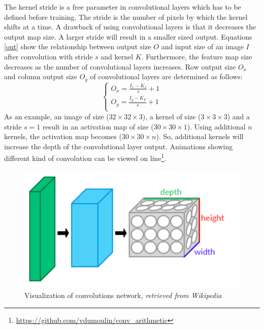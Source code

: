     The kernel stride is a free parameter in convolutional layers which has to be defined before training. The stride is the number of pixels by which the kernel shifts at a time. A drawback of using convolutional layers is that it decreases the output map size. A larger stride will result in a smaller sized output. Equations \ref{out} show the relationship between output size $O$ and input size of an image $I$ after convolution with stride $s$ and kernel $K$. Furthermore, the feature map size decreases as the number of convolutional layers increases. Row output size $O_x$ and column output size $O_y$ of convolutional layers are determined as follows:
    \begin{equation}
        \begin{cases}
            O_x = \frac{I_x-K_x}{s} + 1 \\
            O_y = \frac{I_y - K_Y}{s} + 1 \\
        \end{cases}
        \label{out}
    \end{equation}
    As an example, an image of size ($32\times 32 \times 3$), a kernel of size ($3\times 3\times 3$) and a stride $s=1$ result in an activation map of size ($30 \times 30 \times 1$). Using additional $n$ kernels, the activation map becomes ($30\times30\times n$). So, additional kernels will increase the depth of the convolutional layer output. Animations showing different kind of convolution can be viewed on line\footnote{\url{https://github.com/vdumoulin/conv_arithmetic}}.\\

    \begin{figure}[!h]
        \centering
        \includegraphics[scale = 0.3]{Figures/Conv_layers.png}
        \caption{Visualization of convolutions network, \textit{retrieved from Wikipedia}}
    \end{figure}

